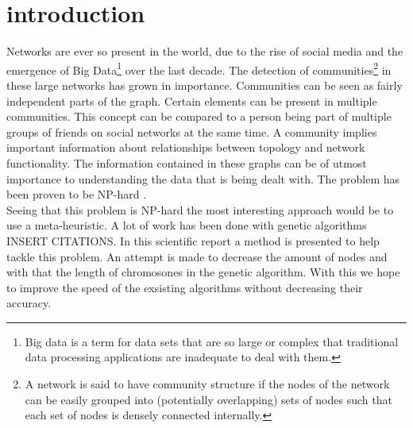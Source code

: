 \section{introduction}

Networks are ever so present in the world, due to the rise of social media and the emergence of Big Data\footnote{Big data is a term for data sets that are so large or complex that traditional data processing applications are inadequate to deal with them.} over the last decade.
The detection of communities\footnote{A network is said to have community structure if the nodes of the network can be easily grouped into (potentially overlapping) sets of nodes such that each set of nodes is densely connected internally.} in these large networks has grown in importance.
Communities can be seen as fairly independent parts of the graph.
Certain elements can be present in multiple communities.
This concept can be compared to a person being part of multiple groups of friends on social networks at the same time.
A community implies important information about relationships between topology and network functionality.
The information contained in these graphs can be of utmost importance to understanding the data that is being dealt with.
The problem has been proven to be NP-hard \cite{Fortunato2010}.\\

Seeing that this problem is NP-hard the most interesting approach would be to use a meta-heuristic.
A lot of work has been done with genetic algorithms INSERT CITATIONS.
In this scientific report a method is presented to help tackle this problem.
An attempt is made to decrease the amount of nodes and with that the length of chromosones in the genetic algorithm.
With this we hope to improve the speed of the exsisting algorithms without decreasing their accuracy.

